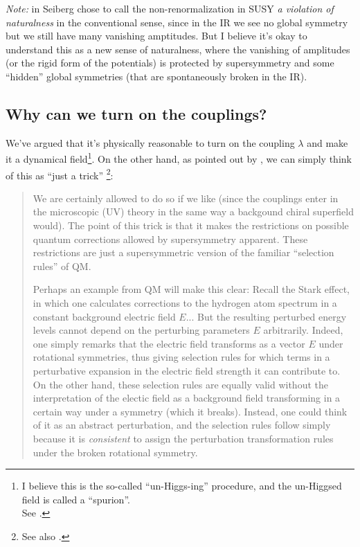 \documentclass[a4paper
	,10pt
]{article}
\begin{document}
	\textit{Note:} in \cite{Seiberg:1993vc} Seiberg chose to call the non-renormalization in SUSY \textit{a violation of naturalness} in the conventional sense, since in the IR we see no global symmetry but we still have many vanishing amptitudes. But I believe it's okay to understand this as a new sense of naturalness, where the vanishing of amplitudes (or the rigid form of the potentials) is protected by supersymmetry and some ``hidden'' global symmetries (that are spontaneously broken in the IR). 
	
\subsection{Why can we turn on the couplings?}
	We've argued that it's physically reasonable to turn on the coupling $\lambda$ and make it a dynamical field\footnote{
		I believe this is the so-called ``un-Higgs-ing'' procedure, and the un-Higgsed field is called a ``spurion''. \\
		See .
	}. On the other hand, as pointed out by \textcite{Argyres:1996abc}, we can simply think of this as ``just a trick'' \footnote{
		See also . 
	}:
	
	\begin{quote}
	We are certainly allowed to do so if we like (since the couplings enter in the microscopic (UV) theory in the same way a backgound chiral superfield would). The point of this trick is that it makes the restrictions on possible quantum corrections allowed by supersymmetry apparent. These restrictions are just a supersymmetric version of the familiar “selection rules” of QM.
		
	Perhaps an example from QM will make this clear: Recall the Stark effect, in which one calculates corrections to the hydrogen atom spectrum in a constant background electric field $E$... But the resulting perturbed energy levels cannot depend on the perturbing parameters $E$ arbitrarily. Indeed, one simply remarks that the electric field transforms as a vector $E$ under rotational symmetries, thus giving selection rules for which terms in a perturbative expansion in the electric field strength it can contribute to. On the other hand, these selection rules are equally valid without the interpretation of the electic field as a background field transforming in a certain way under a symmetry (which it breaks). Instead, one could think of it as an abstract perturbation, and the selection rules follow simply because it is \textit{consistent} to assign the perturbation transformation rules under the broken rotational symmetry.
	\end{quote}
	
\end{document}

